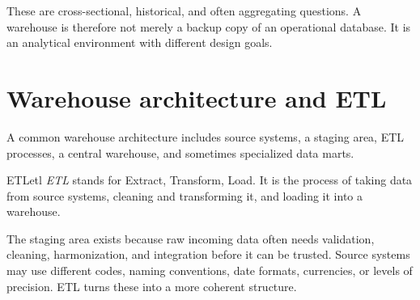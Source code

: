 \documentclass[11pt,a4paper,openany]{book}
\begin{document}
These are cross-sectional, historical, and often aggregating questions. A warehouse is therefore not merely a backup copy of an operational database. It is an analytical environment with different design goals.

\section{Warehouse architecture and ETL}
A common warehouse architecture includes source systems, a staging area, ETL processes, a central warehouse, and sometimes specialized data marts.

\begin{definition}{ETL}{etl}
\emph{ETL} stands for Extract, Transform, Load. It is the process of taking data from source systems, cleaning and transforming it, and loading it into a warehouse.
\end{definition}

The staging area exists because raw incoming data often needs validation, cleaning, harmonization, and integration before it can be trusted. Source systems may use different codes, naming conventions, date formats, currencies, or levels of precision. ETL turns these into a more coherent structure.
\end{document}
